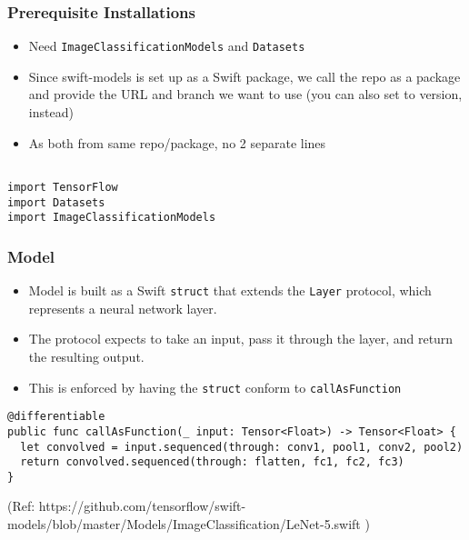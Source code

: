 \begin{frame}[fragile] \frametitle{Prerequisite Installations}

\begin{itemize}
\item Need \lstinline|ImageClassificationModels| and \lstinline|Datasets|
\item Since swift-models is set up as a Swift package, we call the repo as a package and provide the URL and branch we want to use (you can also set to version, instead)
\item As both from same repo/package, no 2 separate lines
\end{itemize}

\begin{lstlisting}[basicstyle=\scriptsize]
%install `.package(url: ``https://github.com/tensorflow/swift-models.git'', .branch(``master''))' ImageClassificationModels Datasets

import TensorFlow
import Datasets
import ImageClassificationModels
\end{lstlisting}


\end{frame}







\begin{frame}[fragile] \frametitle{Model}

\begin{itemize}
\item Model is built as a Swift \lstinline|struct| that extends the \lstinline|Layer| protocol, which represents a neural network layer. 
\item The protocol expects to take an input, pass it through the layer, and return the resulting output. 
\item This is enforced by having the \lstinline|struct| conform to \lstinline|callAsFunction|
\end{itemize}


\begin{lstlisting}[basicstyle=\scriptsize]
@differentiable
public func callAsFunction(_ input: Tensor<Float>) -> Tensor<Float> { 
  let convolved = input.sequenced(through: conv1, pool1, conv2, pool2) 
  return convolved.sequenced(through: flatten, fc1, fc2, fc3) 
}
\end{lstlisting}

{\tiny (Ref: https://github.com/tensorflow/swift-models/blob/master/Models/ImageClassification/LeNet-5.swift )}

\end{frame}

